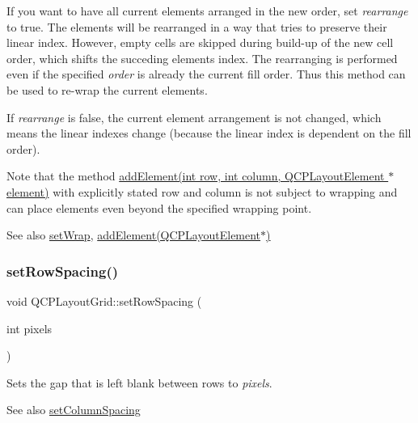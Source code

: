 If you want to have all current elements arranged in the new order, set {\itshape rearrange} to true. The elements will be rearranged in a way that tries to preserve their linear index. However, empty cells are skipped during build-\/up of the new cell order, which shifts the succeding element\textquotesingle{}s index. The rearranging is performed even if the specified {\itshape order} is already the current fill order. Thus this method can be used to re-\/wrap the current elements.

If {\itshape rearrange} is false, the current element arrangement is not changed, which means the linear indexes change (because the linear index is dependent on the fill order).

Note that the method \hyperlink{class_q_c_p_layout_grid_adff1a2ca691ed83d2d24a4cd1fe17012}{add\+Element(int row, int column, Q\+C\+P\+Layout\+Element $\ast$element)} with explicitly stated row and column is not subject to wrapping and can place elements even beyond the specified wrapping point.

\begin{DoxySeeAlso}{See also}
\hyperlink{class_q_c_p_layout_grid_ab36af18d77e4428386d02970382ee598}{set\+Wrap}, \hyperlink{class_q_c_p_layout_grid_a4c44025dd25acd27e053cadfd448ad7b}{add\+Element(\+Q\+C\+P\+Layout\+Element$\ast$)} 
\end{DoxySeeAlso}
\mbox{\label{class_q_c_p_layout_grid_aaef2cd2d456197ee06a208793678e436}} 
\subsubsection{\texorpdfstring{set\+Row\+Spacing()}{setRowSpacing()}}
{\footnotesize\ttfamily void Q\+C\+P\+Layout\+Grid\+::set\+Row\+Spacing (\begin{DoxyParamCaption}\item[{int}]{pixels }\end{DoxyParamCaption})}

Sets the gap that is left blank between rows to {\itshape pixels}.

\begin{DoxySeeAlso}{See also}
\hyperlink{class_q_c_p_layout_grid_a3a49272aba32bb0fddc3bb2a45a3dba0}{set\+Column\+Spacing} 
\end{DoxySeeAlso}
\mbox{\label{class_q_c_p_layout_grid_a7b0273de5369bd93d942edbaf5b166ec}} 
